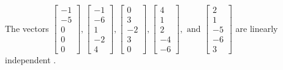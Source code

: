 \begin{exercise}
\begin{exerciseStatement}
  \end{exerciseStatement}
  \begin{exerciseAnswer}
   The vectors \(\left[\begin{array}{r}
-1 \\
-5 \\
0 \\
0 \\
0
\end{array}\right] , \left[\begin{array}{r}
-1 \\
-6 \\
1 \\
-2 \\
4
\end{array}\right] , \left[\begin{array}{r}
0 \\
3 \\
-2 \\
3 \\
0
\end{array}\right] , \left[\begin{array}{r}
4 \\
1 \\
2 \\
-4 \\
-6
\end{array}\right] , \text{ and } \left[\begin{array}{r}
2 \\
1 \\
-5 \\
-6 \\
3
\end{array}\right]\) are 
  	 linearly independent  .
  


  \end{exerciseAnswer}
\end{exercise}